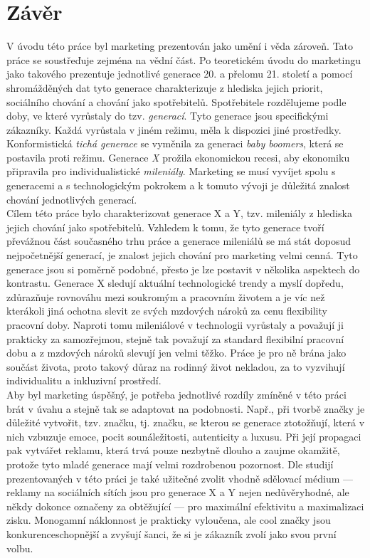 \chapter*{Závěr}

V úvodu této práce byl marketing prezentován jako umění i věda zároveň. Tato práce se soustřeďuje zejména na vědní část. Po teoretickém úvodu do marketingu jako takového prezentuje jednotlivé generace 20. a přelomu 21. století a pomocí shromážděných dat tyto generace charakterizuje z hlediska jejich priorit, sociálního chování a chování jako spotřebitelů.
Spotřebitele rozdělujeme podle doby, ve které vyrůstaly do tzv. \textit{generací}. Tyto generace jsou specifickými zákazníky. Každá vyrůstala v jiném režimu, měla k dispozici jiné prostředky. Konformistická \textit{tichá generace} se vyměnila za generaci \textit{baby boomers}, která se postavila proti režimu. Generace \textit{X} prožila ekonomickou recesi, aby ekonomiku připravila pro individualistické \textit{mileniály}. Marketing se musí vyvíjet spolu s generacemi a s technologickým pokrokem a k tomuto vývoji je důležitá znalost chování jednotlivých generací.\\
Cílem této práce bylo charakterizovat generace X a Y, tzv. mileniály z hlediska jejich chování jako spotřebitelů. Vzhledem k tomu, že tyto generace tvoří převážnou část současného trhu práce a generace mileniálů se má stát doposud nejpočetnější generací, je znalost jejich chování pro marketing velmi cenná. Tyto generace jsou si poměrně podobné, přesto je lze postavit v několika aspektech do kontrastu.
Generace X sledují aktuální technologické trendy a myslí dopředu, zdůrazňuje rovnováhu mezi soukromým a pracovním životem a je víc než kterákoli jiná ochotna slevit ze svých mzdových nároků za cenu flexibility pracovní doby. Naproti tomu mileniálové v technologii vyrůstaly a považují ji prakticky za samozřejmou, stejně tak považují za standard flexibilní pracovní dobu a z mzdových nároků slevují jen velmi těžko. Práce je pro ně brána jako součást života, proto takový důraz na rodinný život nekladou, za to vyzvihují individualitu a inkluzivní prostředí.\\
Aby byl marketing úspěšný, je potřeba jednotlivé rozdíly zmíněné v této práci brát v úvahu a stejně tak se adaptovat na podobnosti. Např., při tvorbě značky je důležité vytvořit, tzv.  značku, tj. značku, se kterou se generace ztotožňují, která v nich vzbuzuje emoce, pocit sounáležitosti, autenticity a luxusu. Při její propagaci pak vytvářet reklamu, která trvá pouze nezbytně dlouho a zaujme okamžitě, protože tyto mladé generace mají velmi rozdrobenou pozornost. Dle studijí prezentovaných v této práci je také užitečné zvolit vhodně sdělovací médium --- reklamy na sociálních sítích jsou pro generace X a Y nejen nedůvěryhodné, ale někdy dokonce označeny za obtěžující --- pro maximální efektivitu a maximalizaci zisku. Monogamní náklonnost je prakticky vyloučena, ale cool značky jsou konkurenceschopnější a zvyšují šanci, že si je zákazník zvolí jako svou první volbu.